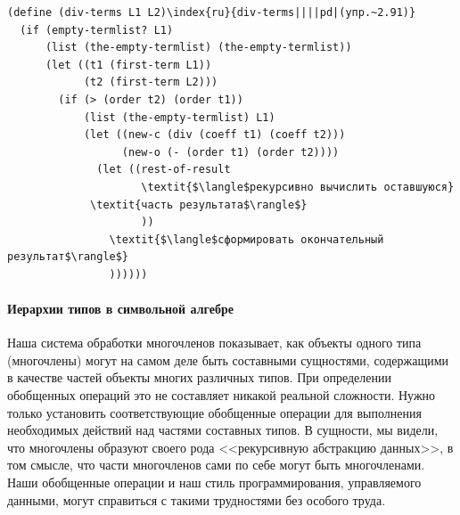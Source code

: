 \begin{exercise}{2.91}
\begin{Verbatim}[fontsize=\small]
(define (div-terms L1 L2)\index{ru}{div-terms||||pd|(упр.~2.91)}
  (if (empty-termlist? L1)
      (list (the-empty-termlist) (the-empty-termlist))
      (let ((t1 (first-term L1))
            (t2 (first-term L2)))
        (if (> (order t2) (order t1))
            (list (the-empty-termlist) L1)
            (let ((new-c (div (coeff t1) (coeff t2)))
                  (new-o (- (order t1) (order t2))))
              (let ((rest-of-result
                     \textit{$\langle$рекурсивно вычислить оставшуюся}
		     \textit{часть результата$\rangle$}
                     ))
                \textit{$\langle$сформировать окончательный результат$\rangle$}
                ))))))
\end{Verbatim}
\end{exercise}

\paragraph{Иерархии типов в символьной алгебре}


Наша система обработки многочленов показывает, как
объекты одного типа (многочлены) могут на самом деле быть составными
сущностями, содержащими в качестве частей объекты многих различных
типов.  При определении обобщенных операций это не составляет никакой
реальной сложности.  Нужно только установить соответствующие
обобщенные операции для выполнения необходимых действий над частями
составных типов.  В сущности, мы видели, что многочлены образуют
своего рода <<рекурсивную абстракцию данных>>, в том смысле, что части
многочленов сами по себе могут быть многочленами.  Наши обобщенные
операции и наш стиль программирования, управляемого данными, могут
справиться с такими трудностями без особого труда.

